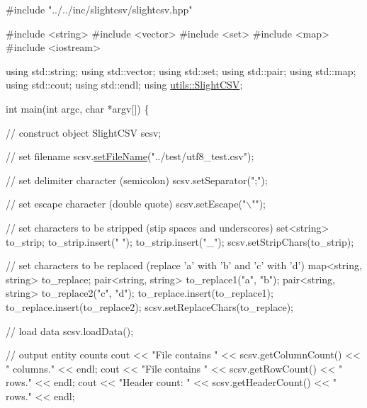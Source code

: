 \begin{DoxyCode}
\textcolor{preprocessor}{#include "../../inc/slightcsv/slightcsv.hpp"}

\textcolor{preprocessor}{#include <string>}
\textcolor{preprocessor}{#include <vector>}
\textcolor{preprocessor}{#include <set>}
\textcolor{preprocessor}{#include <map>}
\textcolor{preprocessor}{#include <iostream>}

\textcolor{keyword}{using} std::string;
\textcolor{keyword}{using} std::vector;
\textcolor{keyword}{using} std::set;
\textcolor{keyword}{using} std::pair;
\textcolor{keyword}{using} std::map;
\textcolor{keyword}{using} std::cout;
\textcolor{keyword}{using} std::endl;
\textcolor{keyword}{using} \hyperlink{classutils_1_1SlightCSV}{utils::SlightCSV};

\textcolor{keywordtype}{int} main(\textcolor{keywordtype}{int} argc, \textcolor{keywordtype}{char} *argv[]) \{

    \textcolor{comment}{// construct object}
    SlightCSV scsv;

    \textcolor{comment}{// set filename}
    scsv.\hyperlink{classutils_1_1SlightCSV_aba4b71a4a4bfa2317985a1a9cd53fc85}{setFileName}(\textcolor{stringliteral}{"../test/utf8\_test.csv"});

    \textcolor{comment}{// set delimiter character (semicolon)}
    scsv.setSeparator(\textcolor{stringliteral}{";"});

    \textcolor{comment}{// set escape character (double quote)}
    scsv.setEscape(\textcolor{stringliteral}{"\(\backslash\)""});

    \textcolor{comment}{// set characters to be stripped (stip spaces and underscores)}
    set<string> to\_strip;
    to\_strip.insert(\textcolor{stringliteral}{" "});
    to\_strip.insert(\textcolor{stringliteral}{"\_"});
    scsv.setStripChars(to\_strip);

    \textcolor{comment}{// set characters to be replaced (replace 'a' with 'b' and 'c' with 'd')}
    map<string, string> to\_replace;
    pair<string, string> to\_replace1(\textcolor{stringliteral}{"a"}, \textcolor{stringliteral}{"b"});
    pair<string, string> to\_replace2(\textcolor{stringliteral}{"c"}, \textcolor{stringliteral}{"d"});
    to\_replace.insert(to\_replace1);
    to\_replace.insert(to\_replace2);
    scsv.setReplaceChars(to\_replace);

    \textcolor{comment}{// load data}
    scsv.loadData();

    \textcolor{comment}{// output entity counts}
    cout << \textcolor{stringliteral}{"File contains "} << scsv.getColumnCount() << \textcolor{stringliteral}{" columns."} << endl;
    cout << \textcolor{stringliteral}{"File contains "} << scsv.getRowCount() << \textcolor{stringliteral}{" rows."} << endl;
    cout << \textcolor{stringliteral}{"Header count: "} << scsv.getHeaderCount() << \textcolor{stringliteral}{" rows."} << endl;


\end{DoxyCode}
